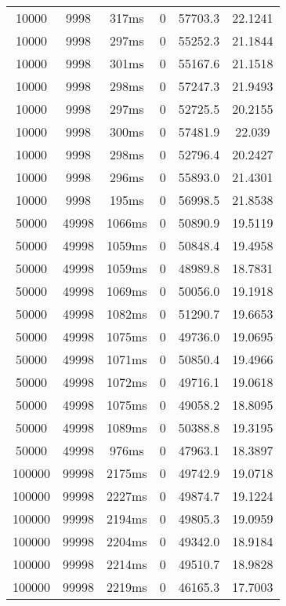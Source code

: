 \documentclass[./main.tex]{subfiles}
\begin{document}
\begin{table}
\begin{tabular}{ c | c | c | c | c | c }
        10000 & 9998 & 317ms & 0 & 57703.3 & 22.1241 \\
        10000 & 9998 & 297ms & 0 & 55252.3 & 21.1844 \\
        10000 & 9998 & 301ms & 0 & 55167.6 & 21.1518 \\
        10000 & 9998 & 298ms & 0 & 57247.3 & 21.9493 \\
        10000 & 9998 & 297ms & 0 & 52725.5 & 20.2155 \\
        10000 & 9998 & 300ms & 0 & 57481.9 & 22.039 \\
        10000 & 9998 & 298ms & 0 & 52796.4 & 20.2427 \\
        \rowcolor{lightgray} 10000 & 9998 & 296ms & 0 & 55893.0 & 21.4301 \\
        10000 & 9998 & 195ms & 0 & 56998.5 & 21.8538 \\
        \hline
        50000 & 49998 & 1066ms & 0 & 50890.9 & 19.5119 \\
        50000 & 49998 & 1059ms & 0 & 50848.4 & 19.4958 \\
        50000 & 49998 & 1059ms & 0 & 48989.8 & 18.7831 \\
        \rowcolor{lightgray} 50000 & 49998 & 1069ms & 0 & 50056.0 & 19.1918 \\
        50000 & 49998 & 1082ms & 0 & 51290.7 & 19.6653 \\
        50000 & 49998 & 1075ms & 0 & 49736.0 & 19.0695 \\
        50000 & 49998 & 1071ms & 0 & 50850.4 & 19.4966 \\
        50000 & 49998 & 1072ms & 0 & 49716.1 & 19.0618 \\
        50000 & 49998 & 1075ms & 0 & 49058.2 & 18.8095 \\
        50000 & 49998 & 1089ms & 0 & 50388.8 & 19.3195 \\
        50000 & 49998 & 976ms & 0 & 47963.1 & 18.3897 \\
        \hline
        100000 & 99998 & 2175ms & 0 & 49742.9 & 19.0718 \\
        100000 & 99998 & 2227ms & 0 & 49874.7 & 19.1224 \\
        100000 & 99998 & 2194ms & 0 & 49805.3 & 19.0959 \\
        100000 & 99998 & 2204ms & 0 & 49342.0 & 18.9184 \\
        100000 & 99998 & 2214ms & 0 & 49510.7 & 18.9828 \\
        100000 & 99998 & 2219ms & 0 & 46165.3 & 17.7003 \\

\end{tabular}
\end{table}
\end{document}
